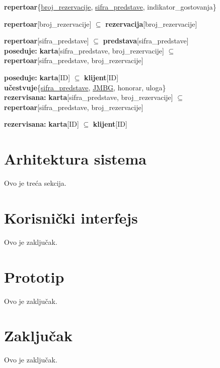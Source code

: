 \documentclass[a4paper]{article}
\begin{document}
\textbf{repertoar}\{\underline{broj\_rezervacije}, \underline{sifra\_predstave}, indikator\_gostovanja\}

\textbf{repertoar}[broj\_rezervacije] $\subseteq$ \textbf{rezervacija}[broj\_rezervacije]

\textbf{repertoar}[sifra\_predstave] $\subseteq$ \textbf{predstava}[sifra\_predstave]\\

\textbf{poseduje:} \textbf{karta}[sifra\_predstave, broj\_rezervacije] 
$\subseteq$ \textbf{repertoar}[sifra\_predstave, broj\_rezervacije]

\textbf{poseduje:} \textbf{karta}[ID] $\subseteq$ \textbf{klijent}[ID]\\

\textbf{učestvuje}\{\underline{sifra\_predstave}, \underline{JMBG}, honorar, uloga\}\\

\textbf{rezervisana:} \textbf{karta}[sifra\_predstave, broj\_rezervacije]
$\subseteq$ \textbf{repertoar}[sifra\_predstave, broj\_rezervacije]

\textbf{rezervisana:} \textbf{karta}[ID] $\subseteq$ \textbf{klijent}[ID]

\section{Arhitektura sistema}
Ovo je treća sekcija.

\section{Korisnički interfejs}
Ovo je zaključak.

\section{Prototip}
Ovo je zaključak.

\section{Zaključak}
Ovo je zaključak.

\newpage

\appendix
 

\end{document}
